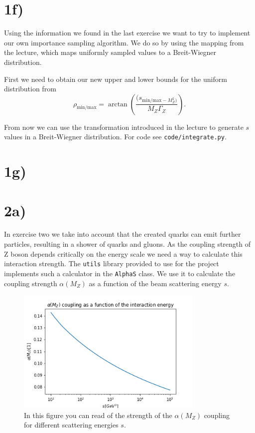 \documentclass[12pt,a4paper]{scrartcl}
\begin{document}
\section*{1f)}
Using the information we found in the last exercise we want to try to implement our own importance sampling algorithm.
We do so by using the mapping from the lecture, which maps uniformly sampled values to a Breit-Wiegner distribution.

First we need to obtain our new upper and lower bounds for the uniform distribution from 
\[
    \rho_{ \text{min/max} } = \arctan( \frac{(s_{ \text{min/max} - M_Z^2) } }{M_Z \Gamma_Z} ) 
.\] 

From now we can use the transformation introduced in the lecture to generate $s$ values in a Breit-Wiegner distribution.
For code see \lstinline{code/integrate.py}.

\section*{1g)}



\section*{2a)}
In exercise two we take into account that the created quarks can emit further particles, resulting in a shower of quarks and gluons.
As the coupling strength of Z boson depends critically on the energy scale we need a way to calculate this interaction strength.
The \lstinline{utils} library provided to use for the project implements such a calculator in the \lstinline{AlphaS} class.
We use it to calculate the coupling strength $\alpha(M_Z)$  as a function of the beam scattering energy $s$.

 \begin{figure}[htpb]
    \centering
    \includegraphics[width=0.8\textwidth]{figures/ex_2a_alpha_coupling.png}
    \caption{In this figure you can read of the strength of the $\alpha(M_Z)$ coupling for different scattering energies $s$.}
    \label{fig:figures-ex_2a_alpha_coupling-png}
\end{figure}
\end{document}

